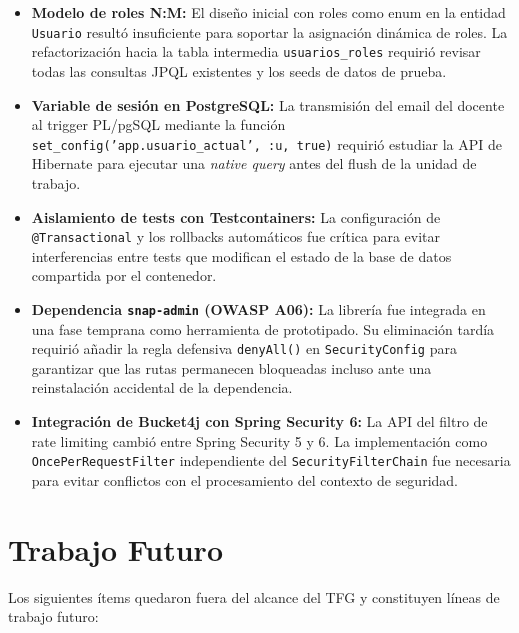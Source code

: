 \documentclass[12pt, a4paper]{report}
\begin{document}
\begin{itemize}
  \item \textbf{Modelo de roles N:M:} El diseño inicial con roles como enum en la
        entidad \texttt{Usuario} resultó insuficiente para soportar la asignación
        dinámica de roles. La refactorización hacia la tabla intermedia
        \texttt{usuarios\_roles} requirió revisar todas las consultas JPQL
        existentes y los seeds de datos de prueba.
  \item \textbf{Variable de sesión en PostgreSQL:} La transmisión del email del
        docente al trigger PL/pgSQL mediante la función
        \texttt{set\_config('app.usuario\_actual', :u, true)} requirió estudiar
        la API de Hibernate para ejecutar una \textit{native query} antes del
        flush de la unidad de trabajo.
  \item \textbf{Aislamiento de tests con Testcontainers:} La configuración de
        \texttt{@Transactional} y los rollbacks automáticos fue crítica para evitar
        interferencias entre tests que modifican el estado de la base de datos
        compartida por el contenedor.
  \item \textbf{Dependencia \texttt{snap-admin} (OWASP A06):} La librería fue
        integrada en una fase temprana como herramienta de prototipado. Su
        eliminación tardía requirió añadir la regla defensiva \texttt{denyAll()}
        en \texttt{SecurityConfig} para garantizar que las rutas permanecen
        bloqueadas incluso ante una reinstalación accidental de la dependencia.
  \item \textbf{Integración de Bucket4j con Spring Security 6:} La API del filtro
        de rate limiting cambió entre Spring Security 5 y 6. La implementación
        como \texttt{OncePerRequestFilter} independiente del
        \texttt{SecurityFilterChain} fue necesaria para evitar conflictos con el
        procesamiento del contexto de seguridad.
\end{itemize}

\section{Trabajo Futuro}

Los siguientes ítems quedaron fuera del alcance del TFG y constituyen líneas de
trabajo futuro:
\end{document}
